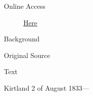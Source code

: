 			\begin{description}
				\item[Online Access] \href{https://www.josephsmithpapers.org/paper-summary/revelation-2-august-1833-a-dc-97/1}{Here}
			\end{description}
			
			\begin{description}
				\item[Background]
			\end{description}
			
			
			\begin{description}
				\item[Original Source]
			\end{description}
			
			
			\begin{description}
				\item[Text]
			\end{description}
			
				\begin{tightcenter}
				Kirtland 2 of August 1833---
				\end{tightcenter}
				
